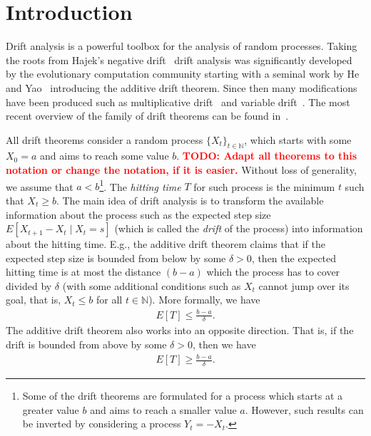 \documentclass[12pt, a4paper]{article}
\title{\text{Additive drift with tail bounds}}
\author{Vihnin F.
    \and Antipov D.
    \and Sinyachenko N.}
\theoremstyle{remark}
\newcommand{\N}{{\mathbb N}}
\newcommand{\todo}[1]{\textbf{\textcolor{red}{TODO: #1}}}
\begin{document}
\maketitle

\section{Introduction}

Drift analysis is a powerful toolbox for the analysis of random processes. Taking the roots from Hajek's negative drift~\cite{Hajek82} drift analysis was significantly developed by the evolutionary computation community starting with a seminal work by He and Yao~\cite{HeY04} introducing the additive drift theorem. Since then many modifications have been produced such as multiplicative drift~\cite{DoerrJW12} and variable drift~\cite{Johannsen10,RoweS12}. The most recent overview of the family of drift theorems can be found in~\cite{Lengler17}.

All drift theorems consider a random process $\{X_t\}_{t \in \N}$, which starts with some $X_0 = a$ and aims to reach some value $b$. \todo{Adapt all theorems to this notation or change the notation, if it is easier.} Without loss of generality, we assume that $a < b$\footnote{Some of the drift theorems are formulated for a process which starts at a greater value $b$ and aims to reach a smaller value $a$. However, such results can be inverted by considering a process $Y_t = -X_t$.}. The \emph{hitting time} $T$ for such process is the minimum $t$ such that $X_t \ge b$. The main idea of drift analysis is to transform the available information about the process such as the expected step size $E[X_{t + 1} - X_t \mid X_t = s]$ (which is called the \emph{drift} of the process) into information about the hitting time. E.g., the additive drift theorem claims that if the expected step size is bounded from below by some $\delta > 0$, then the expected hitting time is at most the distance $(b - a)$ which the process has to cover divided by $\delta$ (with some additional conditions such as $X_t$ cannot jump over its goal, that is, $X_t \le b$ for all $t \in \N$). More formally, we have
\begin{align*}
    E[T] \le \frac{b - a}{\delta}.
\end{align*}
The additive drift theorem also works into an opposite direction. That is, if the drift is bounded from above by some $\delta > 0$, then we have
\begin{align*}
    E[T] \ge \frac{b - a}{\delta}.
\end{align*}
\end{document}
